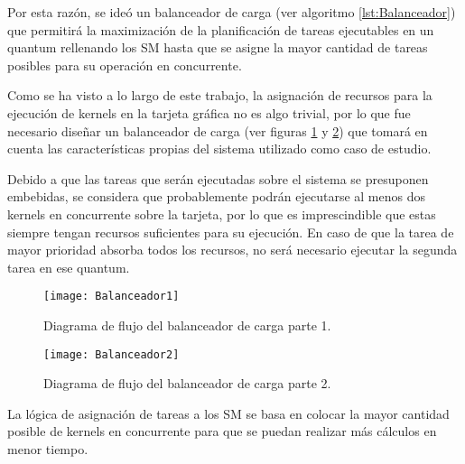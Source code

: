 Por esta razón, se ideó un balanceador de carga (ver algoritmo \ref{lst:Balanceador}) que permitirá la maximización de la planificación de tareas ejecutables en un quantum rellenando los SM hasta que se asigne la mayor cantidad de tareas posibles para su operación en concurrente.
\newline

    Como se ha visto a lo largo de este trabajo, la asignación de recursos para la ejecución de kernels en la tarjeta gráfica no es algo trivial, por lo que fue necesario diseñar un balanceador de carga (ver figuras \ref{fig:Balanceador1} y \ref{fig:Balanceador2}) que tomará en cuenta las características propias del sistema utilizado como caso de estudio.
    \newline
    
    Debido a que las tareas que serán ejecutadas sobre el sistema se presuponen embebidas, se considera que probablemente podrán ejecutarse al menos dos kernels en concurrente sobre la tarjeta, por lo que es imprescindible que estas siempre tengan recursos suficientes para su ejecución. En caso de que la tarea de mayor prioridad absorba todos los recursos, no será necesario ejecutar la segunda tarea en ese quantum.
\newline

    \begin{figure}[!]
      \centering
        \texttt{[image: Balanceador1]}
        \caption{Diagrama de flujo del balanceador de carga parte 1.}
        \label{fig:Balanceador1}
    \end{figure}
    
    \begin{figure}[!]
      \centering
        \texttt{[image: Balanceador2]}
        \caption{Diagrama de flujo del balanceador de carga parte 2.}
        \label{fig:Balanceador2}
    \end{figure}

    

La lógica de asignación de tareas a los SM se basa en colocar la mayor cantidad posible de kernels en concurrente para que se puedan realizar más cálculos en menor tiempo.
\newline


